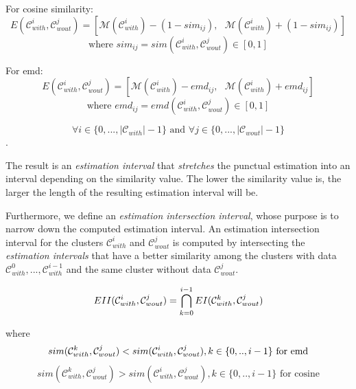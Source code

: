 	For cosine similarity:
	\begin{equation}
	E(\mathcal{C}_{with}^i,\mathcal{C}_{wout}^j) = [\mathcal{M}(\mathcal{C}_{with}^i) - (1 - sim_{ij}), \text{    } \mathcal{M}(\mathcal{C}_{with}^i) + (1 - sim_{ij})]
	\end{equation}
	$$\text{where } sim_{ij} = sim(\mathcal{C}_{with}^i,\mathcal{C}_{wout}^j) \in [0,1]$$
	
	For emd:
	\begin{equation}
	E(\mathcal{C}_{with}^i,\mathcal{C}_{wout}^j) = [\mathcal{M}(\mathcal{C}_{with}^i) - emd_{ij},   \text{    }\mathcal{M}(\mathcal{C}_{with}^i) + emd_{ij}]
	\end{equation}
	$$\text{where } emd_{ij} = emd(\mathcal{C}_{with}^i,\mathcal{C}_{wout}^j) \in [0,1]$$
	
	$$\forall i \in \{0,...,|\mathcal{C}_{with}|-1\} \text{ and } \forall j \in \{0,...,|\mathcal{C}_{wout}|-1\}$$.
	
	The result is an \textit{estimation interval} that \textit{stretches} the punctual estimation into an interval depending on the similarity value. The lower the similarity value is, the larger the length of the resulting estimation interval will be.
	
	
	Furthermore, we define an \textit{estimation intersection interval}, whose purpose is to narrow down the computed estimation interval.
	An estimation intersection interval for the clusters $\mathcal{C}_{with}^i$ and $\mathcal{C}_{wout}^j$ is computed by intersecting the \textit{estimation intervals} that have a better similarity among the clusters with data $\mathcal{C}_{with}^{0}, ..., \mathcal{C}_{with}^{i-1}$ and the same cluster without data $\mathcal{C}_{wout}^j$.
	
	\begin{equation}
	EII(\mathcal{C}_{with}^i,\mathcal{C}_{wout}^j) = \bigcap_{k=0}^{i-1} EI(\mathcal{C}_{with}^k,\mathcal{C}_{wout}^j) \\
	\end{equation}
	
	where
	\begin{equation}
	sim(\mathcal{C}_{with}^k,\mathcal{C}_{wout}^j) < sim(\mathcal{C}_{with}^i,\mathcal{C}_{wout}^j), k \in \{0,..,i - 1\} \text{ for emd}\\
	\end{equation}
	\begin{equation}
	sim(\mathcal{C}_{with}^k,\mathcal{C}_{wout}^j) > sim(\mathcal{C}_{with}^i,\mathcal{C}_{wout}^j), k \in \{0,..,i - 1\} \text{ for cosine} 
	\end{equation}
	

